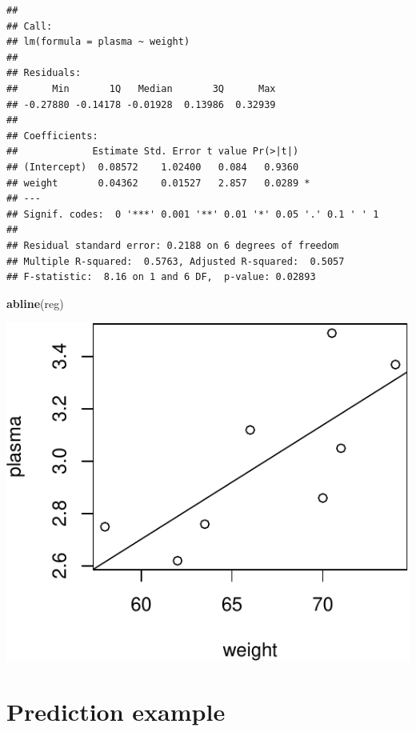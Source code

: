\documentclass[]{article}
\newenvironment{Shaded}{\begin{snugshade}}{\end{snugshade}}
\newcommand{\KeywordTok}[1]{\textcolor[rgb]{0.13,0.29,0.53}{\textbf{#1}}}
\newcommand{\NormalTok}[1]{#1}
\begin{document}
\begin{verbatim}
## 
## Call:
## lm(formula = plasma ~ weight)
## 
## Residuals:
##      Min       1Q   Median       3Q      Max 
## -0.27880 -0.14178 -0.01928  0.13986  0.32939 
## 
## Coefficients:
##             Estimate Std. Error t value Pr(>|t|)  
## (Intercept)  0.08572    1.02400   0.084   0.9360  
## weight       0.04362    0.01527   2.857   0.0289 *
## ---
## Signif. codes:  0 '***' 0.001 '**' 0.01 '*' 0.05 '.' 0.1 ' ' 1
## 
## Residual standard error: 0.2188 on 6 degrees of freedom
## Multiple R-squared:  0.5763, Adjusted R-squared:  0.5057 
## F-statistic:  8.16 on 1 and 6 DF,  p-value: 0.02893
\end{verbatim}

\begin{Shaded}
\begin{Highlighting}[]
\KeywordTok{abline}\NormalTok{(reg)}
\end{Highlighting}
\end{Shaded}

\begin{center}\includegraphics{session-regression-I-files/figures/unnamed-chunk-3-1} \end{center}

\hypertarget{prediction-example}{%
\section{Prediction example}\label{prediction-example}}
\end{document}
